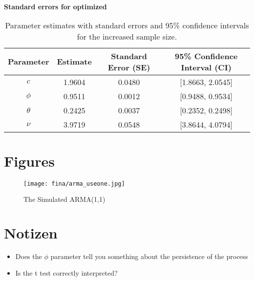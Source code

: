\documentclass[12pt]{article}
\begin{document}
\textbf{Standard errors for optimized}
\begin{table}[h!]
\centering
\begin{tabular}{|c|c|c|c|}
\hline
\textbf{Parameter} & \textbf{Estimate} & \textbf{Standard Error (SE)} & \textbf{95\% Confidence Interval (CI)} \\ \hline
$c$     & 1.9604 & 0.0480 & [1.8663, 2.0545] \\ \hline
$\phi$  & 0.9511 & 0.0012 & [0.9488, 0.9534] \\ \hline
$\theta$ & 0.2425 & 0.0037 & [0.2352, 0.2498] \\ \hline
$\nu$    & 3.9719 & 0.0548 & [3.8644, 4.0794] \\ \hline
\end{tabular}
\caption{Parameter estimates with standard errors and 95\% confidence intervals for the increased sample size.}
\label{tab:confidence_intervals_large_sample}
\end{table}








\newpage
\section{Figures}
 \begin{figure}[h!]
    \centering
    \texttt{[image: fina/arma\_useone.jpg]} 
    \caption{The Simulated ARMA(1,1)}
    \label{fig:armaone}
\end{figure}


\newpage
\section{Notizen}
\begin{itemize}
    \item Does the $\phi$ parameter tell you something about the persistence of the process
    \item Is the t test correctly interpreted?
\end{itemize}
\end{document}
